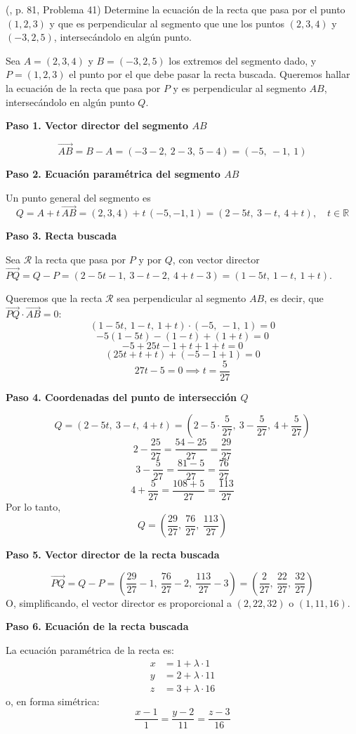 \begin{prob} (\cite{espinoza2006Algebralineal}, p. 81, Problema 41) Determine la ecuación de la recta que pasa por el punto $(1,2,3)$ y que es perpendicular al segmento que une los puntos $(2,3,4)$ y $(-3,2,5)$, intersecándolo en algún punto.
\begin{myproof}
Sea $A = (2,3,4)$ y $B = (-3,2,5)$ los extremos del segmento dado, y $P = (1,2,3)$ el punto por el que debe pasar la recta buscada. Queremos hallar la ecuación de la recta que pasa por $P$ y es perpendicular al segmento $AB$, intersecándolo en algún punto $Q$.

\textbf{Paso 1. Vector director del segmento $AB$}

\[
\vec{AB} = B - A = (-3 - 2,\ 2 - 3,\ 5 - 4) = (-5,\ -1,\ 1)
\]

\textbf{Paso 2. Ecuación paramétrica del segmento $AB$}

Un punto general del segmento es
\[
Q = A + t\,\vec{AB} = (2,3,4) + t\,(-5,-1,1) = (2-5t,\ 3-t,\ 4+t), \quad t \in \mathbb{R}
\]

\textbf{Paso 3. Recta buscada}

Sea $\mathcal{R}$ la recta que pasa por $P$ y por $Q$, con vector director $\vec{PQ} = Q - P = (2-5t-1,\ 3-t-2,\ 4+t-3) = (1-5t,\ 1-t,\ 1+t)$.

Queremos que la recta $\mathcal{R}$ sea perpendicular al segmento $AB$, es decir, que $\vec{PQ} \cdot \vec{AB} = 0$:
\[
(1-5t,\ 1-t,\ 1+t) \cdot (-5,\ -1,\ 1) = 0
\]
\[
-5(1-5t) - (1-t) + (1+t) = 0
\]
\[
-5 + 25t - 1 + t + 1 + t = 0
\]
\[
(25t + t + t) + (-5 - 1 + 1) = 0
\]
\[
27t - 5 = 0 \implies t = \frac{5}{27}
\]

\textbf{Paso 4. Coordenadas del punto de intersección $Q$}

\[
Q = (2 - 5t,\ 3 - t,\ 4 + t) = \left(2 - 5 \cdot \frac{5}{27},\ 3 - \frac{5}{27},\ 4 + \frac{5}{27}\right)
\]
\[
2 - \frac{25}{27} = \frac{54 - 25}{27} = \frac{29}{27}
\]
\[
3 - \frac{5}{27} = \frac{81 - 5}{27} = \frac{76}{27}
\]
\[
4 + \frac{5}{27} = \frac{108 + 5}{27} = \frac{113}{27}
\]
Por lo tanto,
\[
Q = \left(\frac{29}{27},\ \frac{76}{27},\ \frac{113}{27}\right)
\]

\textbf{Paso 5. Vector director de la recta buscada}

\[
\vec{PQ} = Q - P = \left(\frac{29}{27} - 1,\ \frac{76}{27} - 2,\ \frac{113}{27} - 3\right) = \left(\frac{2}{27},\ \frac{22}{27},\ \frac{32}{27}\right)
\]
O, simplificando, el vector director es proporcional a $(2,22,32)$ o $(1,11,16)$.

\textbf{Paso 6. Ecuación de la recta buscada}

La ecuación paramétrica de la recta es:
\[
\boxed{
\begin{aligned}
x &= 1 + \lambda \cdot 1 \\
y &= 2 + \lambda \cdot 11 \\
z &= 3 + \lambda \cdot 16
\end{aligned}
}
\]
o, en forma simétrica:
\[
\boxed{
\frac{x - 1}{1} = \frac{y - 2}{11} = \frac{z - 3}{16}
}
\]
\end{myproof}

\end{prob}

